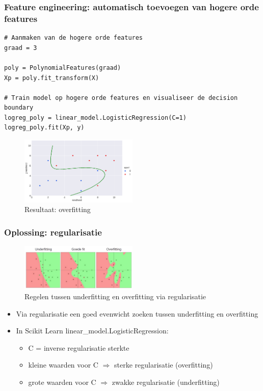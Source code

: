 \documentclass{article}
\begin{document}
\subsubsection{Feature engineering: automatisch toevoegen van hogere orde features}

\begin{verbatim}
# Aanmaken van de hogere orde features
graad = 3

poly = PolynomialFeatures(graad)
Xp = poly.fit_transform(X)

# Train model op hogere orde features en visualiseer de decision boundary
logreg_poly = linear_model.LogisticRegression(C=1)
logreg_poly.fit(Xp, y)
\end{verbatim}

\begin{figure}[H]
    \centering
    \includegraphics[width=0.5\textwidth]{logistic-non-linear2.png}
    \caption{Resultaat: overfitting}
\end{figure}


\subsubsection{Oplossing: regularisatie}

\begin{figure}[H]
    \centering
    \includegraphics[width=0.5\textwidth]{logistic-fitting.png}
    \caption{Regelen tussen underfitting en overfitting via regularisatie}
\end{figure}

\begin{itemize}
    \item Via regularisatie een goed evenwicht zoeken tussen underfitting en overfitting
    \item In Scikit Learn linear\_model.LogisticRegression:
    \begin{itemize}
        \item C = inverse regularisatie sterkte
        \item kleine waarden voor C $\Rightarrow$ sterke regularisatie (overfitting)
        \item grote waarden voor C $\Rightarrow$ zwakke regularisatie (underfitting)
    \end{itemize}
\end{itemize}
\end{document}

